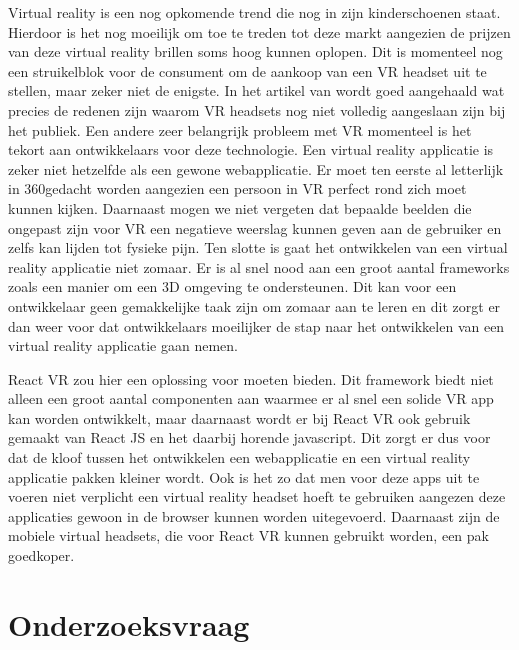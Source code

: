 Virtual reality is een nog opkomende trend die nog in zijn kinderschoenen staat. Hierdoor is het nog moeilijk om toe te treden tot deze markt aangezien de prijzen van deze virtual reality brillen soms hoog kunnen oplopen. Dit is momenteel nog een struikelblok voor de consument om de aankoop van een VR  headset uit te stellen, maar zeker niet de enigste. In het artikel van \autocite{Abarrera2017} wordt goed aangehaald wat precies de redenen zijn waarom VR headsets nog niet volledig aangeslaan zijn bij het publiek. Een andere zeer belangrijk probleem met VR momenteel is het tekort aan ontwikkelaars voor deze technologie. Een virtual reality applicatie is zeker niet hetzelfde als een gewone webapplicatie. Er moet ten eerste al letterlijk in 360\textdegree gedacht worden aangezien een persoon in VR perfect rond zich moet kunnen kijken. Daarnaast mogen we niet vergeten dat bepaalde beelden die ongepast zijn voor VR een negatieve weerslag kunnen geven aan de gebruiker en zelfs kan lijden tot fysieke pijn. Ten slotte is gaat het ontwikkelen van een virtual reality applicatie niet zomaar. Er is al snel nood aan een groot aantal frameworks zoals een manier om een 3D omgeving te ondersteunen. Dit kan voor een ontwikkelaar geen gemakkelijke taak zijn om zomaar aan te leren en dit zorgt er dan weer voor dat ontwikkelaars moeilijker de stap naar het ontwikkelen van een virtual reality applicatie gaan nemen.

React VR zou hier een oplossing voor moeten bieden. Dit framework biedt niet alleen een groot aantal componenten aan waarmee er al snel een solide VR app kan worden ontwikkelt, maar daarnaast wordt er bij React VR ook gebruik gemaakt van React JS en het daarbij horende javascript. Dit zorgt er dus voor dat de kloof tussen het ontwikkelen een webapplicatie en een virtual reality applicatie pakken kleiner wordt. Ook is het zo dat men voor deze apps uit te voeren niet verplicht een virtual reality headset hoeft te gebruiken aangezen deze applicaties gewoon in de browser kunnen worden uitegevoerd. Daarnaast zijn de mobiele virtual headsets, die voor React VR kunnen gebruikt worden, een pak goedkoper.


\section{Onderzoeksvraag}
\label{sec:onderzoeksvraag}

